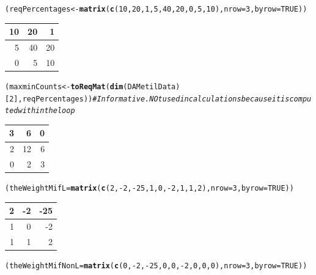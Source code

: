 \documentclass[a4paper,10pt]{article}\usepackage[]{graphicx}\usepackage[]{color}
\makeatletter
\newcommand{\hlnum}[1]{\textcolor[rgb]{0.686,0.059,0.569}{#1}}%
\newcommand{\hlcom}[1]{\textcolor[rgb]{0.678,0.584,0.686}{\textit{#1}}}%
\newcommand{\hlopt}[1]{\textcolor[rgb]{0,0,0}{#1}}%
\newcommand{\hlstd}[1]{\textcolor[rgb]{0.345,0.345,0.345}{#1}}%
\newcommand{\hlkwb}[1]{\textcolor[rgb]{0.69,0.353,0.396}{#1}}%
\newcommand{\hlkwc}[1]{\textcolor[rgb]{0.333,0.667,0.333}{#1}}%
\newcommand{\hlkwd}[1]{\textcolor[rgb]{0.737,0.353,0.396}{\textbf{#1}}}%
\newenvironment{kframe}{%
 \def\at@end@of@kframe{}%
 \ifinner\ifhmode%
  \def\at@end@of@kframe{\end{minipage}}%
  \begin{minipage}{\columnwidth}%
 \fi\fi%
 \def\FrameCommand##1{\hskip\@totalleftmargin \hskip-\fboxsep
 \colorbox{shadecolor}{##1}\hskip-\fboxsep
     \hskip-\linewidth \hskip-\@totalleftmargin \hskip\columnwidth}%
 \MakeFramed {\advance\hsize-\width
   \@totalleftmargin\z@ \linewidth\hsize
   \@setminipage}}%
 {\par\unskip\endMakeFramed%
 \at@end@of@kframe}
\newenvironment{knitrout}{}{} %
\makeatother
\begin{document}
\begin{knitrout}
\color{fgcolor}\begin{kframe}
\begin{alltt}
\hlstd{(reqPercentages}   \hlkwb{<-} \hlkwd{matrix} \hlstd{(}\hlkwd{c}\hlstd{(}\hlnum{10}\hlstd{,} \hlnum{20}\hlstd{,} \hlnum{1}\hlstd{,} \hlnum{5}\hlstd{,} \hlnum{40}\hlstd{,} \hlnum{20}\hlstd{,} \hlnum{0}\hlstd{,} \hlnum{5}\hlstd{,} \hlnum{10}\hlstd{),} \hlkwc{nrow}\hlstd{=}\hlnum{3}\hlstd{,} \hlkwc{byrow}\hlstd{=}\hlnum{TRUE}\hlstd{))}
\end{alltt}
\end{kframe}


\begin{tabular}{r|r|r}
\hline
10 & 20 & 1\\
\hline
5 & 40 & 20\\
\hline
0 & 5 & 10\\
\hline
\end{tabular}\begin{kframe}\begin{alltt}
\hlstd{(maxminCounts} \hlkwb{<-} \hlkwd{toReqMat}\hlstd{(}\hlkwd{dim}\hlstd{(DAMetilData)[}\hlnum{2}\hlstd{], reqPercentages))} \hlcom{# Informative. NOt used in calculations because it is computed within the loop}
\end{alltt}
\end{kframe}


\begin{tabular}{r|r|r}
\hline
3 & 6 & 0\\
\hline
2 & 12 & 6\\
\hline
0 & 2 & 3\\
\hline
\end{tabular}\begin{kframe}\begin{alltt}
\hlstd{(theWeightMifL}\hlkwb{=}\hlkwd{matrix} \hlstd{(}\hlkwd{c}\hlstd{(}\hlnum{2}\hlstd{,}\hlopt{-}\hlnum{2}\hlstd{,}\hlopt{-}\hlnum{25}\hlstd{,}\hlnum{1}\hlstd{,}\hlnum{0}\hlstd{,}\hlopt{-}\hlnum{2}\hlstd{,}\hlnum{1}\hlstd{,}\hlnum{1}\hlstd{,}\hlnum{2}\hlstd{),} \hlkwc{nrow}\hlstd{=}\hlnum{3}\hlstd{,} \hlkwc{byrow}\hlstd{=}\hlnum{TRUE}\hlstd{))}
\end{alltt}
\end{kframe}


\begin{tabular}{r|r|r}
\hline
2 & -2 & -25\\
\hline
1 & 0 & -2\\
\hline
1 & 1 & 2\\
\hline
\end{tabular}\begin{kframe}\begin{alltt}
\hlstd{(theWeightMifNonL}\hlkwb{=}\hlkwd{matrix} \hlstd{(}\hlkwd{c}\hlstd{(}\hlnum{0}\hlstd{,}\hlopt{-}\hlnum{2}\hlstd{,}\hlopt{-}\hlnum{25}\hlstd{,}\hlnum{0}\hlstd{,}\hlnum{0}\hlstd{,}\hlopt{-}\hlnum{2}\hlstd{,}\hlnum{0}\hlstd{,}\hlnum{0}\hlstd{,}\hlnum{0}\hlstd{),} \hlkwc{nrow}\hlstd{=}\hlnum{3}\hlstd{,} \hlkwc{byrow}\hlstd{=}\hlnum{TRUE}\hlstd{))}
\end{alltt}
\end{kframe}



\end{knitrout}
\end{document}
